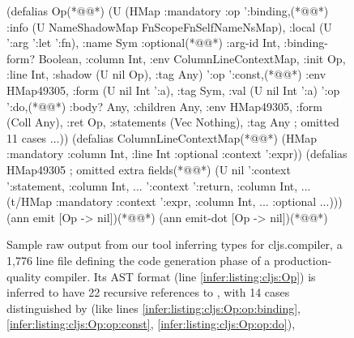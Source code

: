 \begin{figure}
\begin{cljlistingnumbered}
  (defalias Op(*@\label{infer:listing:cljs:Op}@*)
    (U (HMap :mandatory
             {:op ':binding,(*@\label{infer:listing:cljs:Op:op:binding}@*)
              :info (U NameShadowMap
                       FnScopeFnSelfNameNsMap),
              :local (U ':arg ':let ':fn),
              :name Sym}
             :optional(*@\label{infer:listing:cljs:Op:optional}@*)
             {:arg-id Int,
              :binding-form? Boolean,
              :column Int,
              :env ColumnLineContextMap,
              :init Op,
              :line Int,
              :shadow (U nil Op),
              :tag Any})
      '{:op ':const,(*@\label{infer:listing:cljs:Op:op:const}@*)
        :env HMap49305,
        :form (U nil Int ':a), :tag Sym,
        :val (U nil Int ':a)}
      '{:op ':do,(*@\label{infer:listing:cljs:Op:op:do}@*)
        :body? Any, :children Any,
        :env HMap49305,
        :form (Coll Any),
        :ret Op, :statements (Vec Nothing),
        :tag Any}
      ; omitted 11 cases
      ...))
  (defalias ColumnLineContextMap(*@\label{infer:listing:cljs:ColumnLineContextMap}@*)
    (HMap :mandatory {:column Int, :line Int}
          :optional {:context ':expr}))
  (defalias HMap49305 ; omitted extra fields(*@\label{infer:listing:cljs:HMap49305}@*)
    (U nil
       '{:context ':statement, :column Int, ...}
       '{:context ':return, :column Int, ...}
       (t/HMap :mandatory
               {:context ':expr, :column Int, ...}
               :optional {...})))
  (ann emit [Op -> nil])(*@\label{infer:listing:cljs:emit}@*)
  (ann emit-dot [Op -> nil])(*@\label{infer:listing:cljs:emit-dot}@*)
\end{cljlistingnumbered}
\caption{
         Sample raw output from our
         tool inferring types for cljs.compiler,
         a 1,776 line file defining the code generation phase of
         a production-quality compiler.
         Its AST format (line \ref{infer:listing:cljs:Op}) is inferred to have 22 recursive references to ,
         with 14 cases distinguished by  (like lines \ref{infer:listing:cljs:Op:op:binding},
         \ref{infer:listing:cljs:Op:op:const}, \ref{infer:listing:cljs:Op:op:do}),
}
\end{figure}
